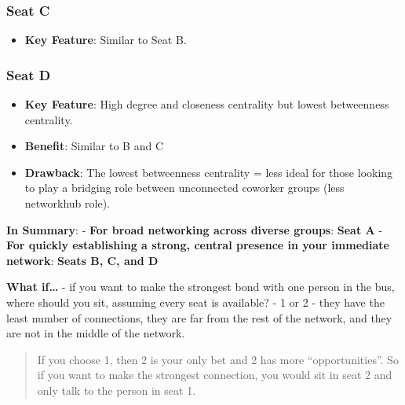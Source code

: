 \documentclass[
]{article}
\providecommand{\tightlist}{%
  \setlength{\itemsep}{0pt}\setlength{\parskip}{0pt}}
\begin{document}
\hypertarget{seat-c}{%
\subsubsection{Seat C}\label{seat-c}}

\begin{itemize}
\tightlist
\item
  \textbf{Key Feature}: Similar to Seat B.
\end{itemize}

\hypertarget{seat-d}{%
\subsubsection{Seat D}\label{seat-d}}

\begin{itemize}
\tightlist
\item
  \textbf{Key Feature}: High degree and closeness centrality but lowest
  betweenness centrality.
\item
  \textbf{Benefit}: Similar to B and C
\item
  \textbf{Drawback}: The lowest betweenness centrality = less ideal for
  those looking to play a bridging role between unconnected coworker
  groups (less networkhub role).
\end{itemize}

\textbf{In Summary}: - \textbf{For broad networking across diverse
groups}: \textbf{Seat A} - \textbf{For quickly establishing a strong,
central presence in your immediate network}: \textbf{Seats B, C, and D}

\textbf{What if\ldots{}} - if you want to make the strongest bond with
one person in the bus, where should you sit, assuming every seat is
available? - 1 or 2 - they have the least number of connections, they
are far from the rest of the network, and they are not in the middle of
the network.

\begin{quote}
If you choose 1, then 2 is your only bet and 2 has more
``opportunities''. So if you want to make the strongest connection, you
would sit in seat 2 and only talk to the person in seat 1.
\end{quote}
\end{document}
